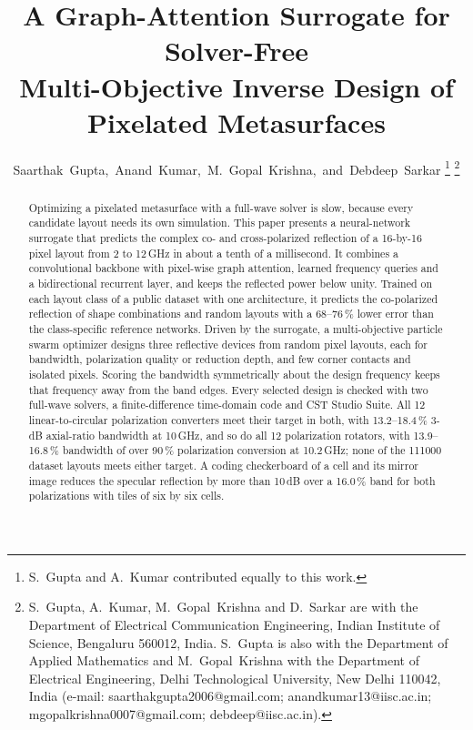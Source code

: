 \documentclass[journal]{IEEEtran}
\begin{document}
\title{A Graph-Attention Surrogate for Solver-Free\\
Multi-Objective Inverse Design of Pixelated Metasurfaces}

\author{Saarthak~Gupta,~Anand~Kumar,~M.~Gopal~Krishna,~and~Debdeep~Sarkar%
\thanks{S.~Gupta and A.~Kumar contributed equally to this work.}%
\thanks{S.~Gupta, A.~Kumar, M.~Gopal~Krishna and D.~Sarkar are with the Department of Electrical Communication Engineering, Indian Institute of Science, Bengaluru 560012, India. S.~Gupta is also with the Department of Applied Mathematics and M.~Gopal~Krishna with the Department of Electrical Engineering, Delhi Technological University, New Delhi 110042, India (e-mail: saarthakgupta2006@gmail.com; anandkumar13@iisc.ac.in; mgopalkrishna0007@gmail.com; debdeep@iisc.ac.in).}}


\maketitle

\begin{abstract}
Optimizing a pixelated metasurface with a full-wave solver is slow, because every candidate layout needs its own simulation. This paper presents a neural-network surrogate that predicts the complex co- and cross-polarized reflection of a 16-by-16 pixel layout from 2 to 12\,GHz in about a tenth of a millisecond. It combines a convolutional backbone with pixel-wise graph attention, learned frequency queries and a bidirectional recurrent layer, and keeps the reflected power below unity. Trained on each layout class of a public dataset with one architecture, it predicts the co-polarized reflection of shape combinations and random layouts with a 68--76\,\% lower error than the class-specific reference networks. Driven by the surrogate, a multi-objective particle swarm optimizer designs three reflective devices from random pixel layouts, each for bandwidth, polarization quality or reduction depth, and few corner contacts and isolated pixels. Scoring the bandwidth symmetrically about the design frequency keeps that frequency away from the band edges. Every selected design is checked with two full-wave solvers, a finite-difference time-domain code and CST Studio Suite. All 12 linear-to-circular polarization converters meet their target in both, with 13.2--18.4\,\% 3-dB axial-ratio bandwidth at 10\,GHz, and so do all 12 polarization rotators, with 13.9--16.8\,\% bandwidth of over 90\,\% polarization conversion at 10.2\,GHz; none of the \num{111000} dataset layouts meets either target. A coding checkerboard of a cell and its mirror image reduces the specular reflection by more than 10\,dB over a 16.0\,\% band for both polarizations with tiles of six by six cells.
\end{abstract}
\end{document}
